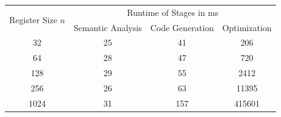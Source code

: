 \begin{table}[]
    \begin{tabular}{c|ccc}
    \multirow{2}{*}{Register Size $n$} & \multicolumn{3}{c}{Runtime of Stages in ms}                                                  \\ \cline{2-4} 
                                       & \multicolumn{1}{c|}{Semantic Analysis} & \multicolumn{1}{c|}{Code Generation} & Optimization \\ \hline
    32                                 & \multicolumn{1}{c|}{25}                & \multicolumn{1}{c|}{41}              & 206          \\
    64                                 & \multicolumn{1}{c|}{28}                & \multicolumn{1}{c|}{47}              & 720          \\
    128                                & \multicolumn{1}{c|}{29}                & \multicolumn{1}{c|}{55}              & 2412         \\
    256                                & \multicolumn{1}{c|}{26}                & \multicolumn{1}{c|}{63}              & 11395        \\
    1024                               & \multicolumn{1}{c|}{31}                & \multicolumn{1}{c|}{157}             & 415601      
    \end{tabular}
\end{table}